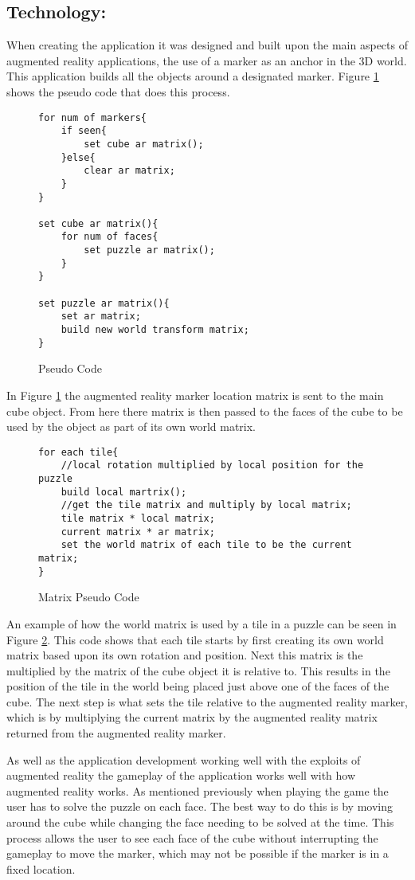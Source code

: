 \subsection{Technology: }\label{tech}
When creating the application it was designed and built upon the main aspects of augmented reality applications, the use of a marker as an anchor in the 3D world.
This application builds all the objects around a designated marker.
Figure \ref{sc:position_pseudo} shows the pseudo code that does this process.

\begin{figure}[h|]
\centering
\begin{lstlisting}
for num of markers{
	if seen{
		set cube ar matrix();
	}else{
		clear ar matrix;
	}
}

set cube ar matrix(){
	for num of faces{
		set puzzle ar matrix();
	}
}

set puzzle ar matrix(){
	set ar matrix;
	build new world transform matrix;
}
\end{lstlisting}
\caption{Pseudo Code}
\label{sc:position_pseudo}
\end{figure}

In Figure \ref{sc:position_pseudo} the augmented reality marker location matrix is sent to the main cube object.
From here there matrix is then passed to the faces of the cube to be used by the object as part of its own world matrix.

\begin{figure}[h|]
\centering
\begin{lstlisting}
for each tile{
	//local rotation multiplied by local position for the puzzle
	build local martrix();
	//get the tile matrix and multiply by local matrix;
	tile matrix * local matrix;
	current matrix * ar matrix;
	set the world matrix of each tile to be the current matrix;
}
\end{lstlisting}
\caption{Matrix Pseudo Code}
\label{sc:matrix_pseudo}
\end{figure}

An example of how the world matrix is used by a tile in a puzzle can be seen in Figure \ref{sc:matrix_pseudo}.
This code shows that each tile starts by first creating its own world matrix based upon its own rotation and position.
Next this matrix is the multiplied by the matrix of the cube object it is relative to.
This results in the position of the tile in the world being placed just above one of the faces of the cube.
The next step is what sets the tile relative to the augmented reality marker, which is by multiplying the current matrix by the augmented reality matrix returned from the augmented reality marker.

As well as the application development working well with the exploits of augmented reality the gameplay of the application works well with how augmented reality works.
As mentioned previously when playing the game the user has to solve the puzzle on each face.
The best way to do this is by moving around the cube while changing the face needing to be solved at the time.
This process allows the user to see each face of the cube without interrupting the gameplay to move the marker, which may not be possible if the marker is in a fixed location.
